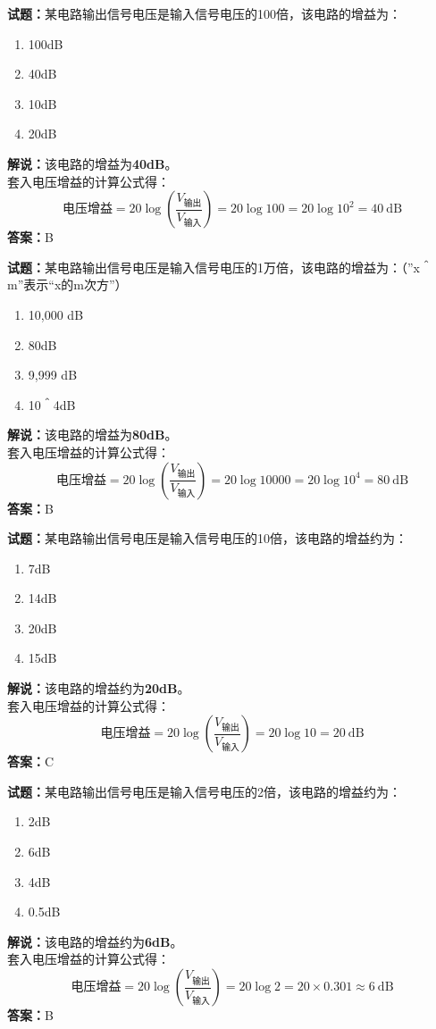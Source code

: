 \documentclass{ctexbook}
\begin{document}
\bigskip

\noindent\textbf{试题：}某电路输出信号电压是输入信号电压的100倍，该电路的增益为：
\begin{enumerate}[leftmargin=3em]
  \item 100dB
  \item 40dB
  \item 10dB
  \item 20dB
\end{enumerate}
\noindent\textbf{解说：}该电路的增益为\textbf{40dB}。\\
套入电压增益的计算公式得：
$$\mbox{电压增益}=20 \log \left( {\frac{V_{ \mbox{输出} }}{V_{ \mbox{输入} }}} \right)=20 \log 100=20 \log 10^2= 40 \ \mathrm{dB}$$
\noindent\textbf{答案：}B

\bigskip

\noindent\textbf{试题：}某电路输出信号电压是输入信号电压的1万倍，该电路的增益为：（”x＾m”表示“x的m次方”）
\begin{enumerate}[leftmargin=3em]
  \item 10,000 dB
  \item 80dB
  \item 9,999 dB
  \item 10＾4dB
\end{enumerate}
\noindent\textbf{解说：}该电路的增益为\textbf{80dB}。\\
套入电压增益的计算公式得：
$$\mbox{电压增益}=20 \log \left( {\frac{V_{ \mbox{输出} }}{V_{ \mbox{输入} }}} \right)=20 \log 10000=20 \log 10^4= 80 \ \mathrm{dB}$$
\noindent\textbf{答案：}B

\bigskip

\noindent\textbf{试题：}某电路输出信号电压是输入信号电压的10倍，该电路的增益约为：
\begin{enumerate}[leftmargin=3em]
  \item 7dB
  \item 14dB
  \item 20dB
  \item 15dB
\end{enumerate}
\noindent\textbf{解说：}该电路的增益约为\textbf{20dB}。\\
套入电压增益的计算公式得：
$$\mbox{电压增益}=20 \log \left( {\frac{V_{ \mbox{输出} }}{V_{ \mbox{输入} }}} \right)=20 \log 10=20 \ \mathrm{dB}$$
\noindent\textbf{答案：}C

\bigskip

\noindent\textbf{试题：}某电路输出信号电压是输入信号电压的2倍，该电路的增益约为：
\begin{enumerate}[leftmargin=3em]
  \item 2dB
  \item 6dB
  \item 4dB
  \item 0.5dB
\end{enumerate}
\noindent\textbf{解说：}该电路的增益约为\textbf{6dB}。\\
套入电压增益的计算公式得：
$$\mbox{电压增益}=20 \log \left( {\frac{V_{ \mbox{输出} }}{V_{ \mbox{输入} }}} \right)=20 \log 2 = 20 \times 0.301 \approx 6 \ \mathrm{dB}$$
\noindent\textbf{答案：}B
\end{document}
